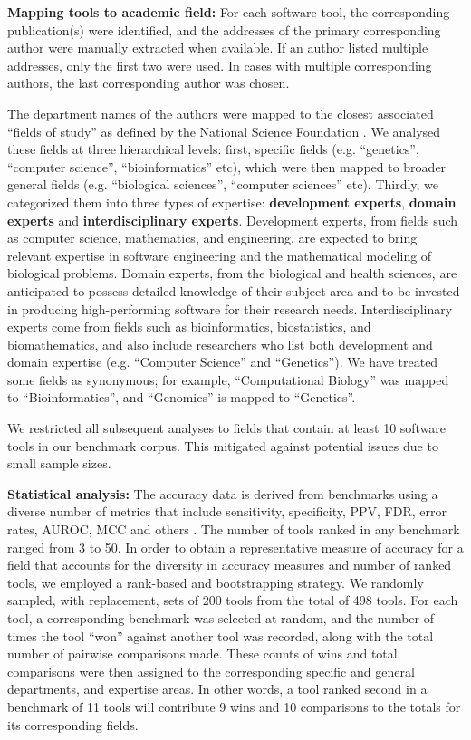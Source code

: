 \documentclass[fleqn,10pt,doc,onecolumn]{SelfArx}%
\begin{document}
\textbf{Mapping tools to academic field:} For each software tool, the
corresponding publication(s) were identified, and the addresses of the
primary corresponding author were manually extracted when
available. If an author listed multiple addresses, only the first two
were used. In cases with multiple corresponding authors, the last
corresponding author was chosen.


The department names of the authors were mapped to the closest
associated ``fields of study'' as defined by the National Science
Foundation \cite{fields2014}. We analysed these fields at three
hierarchical levels: first, specific fields (e.g. ``genetics'',
``computer science'', ``bioinformatics'' etc), which were then mapped
to broader general fields (e.g. ``biological sciences'', ``computer
sciences'' etc). Thirdly, we categorized them into three types of
expertise: \textbf{development experts}, \textbf{domain experts} and
\textbf{interdisciplinary experts}.  Development experts, from fields
such as computer science, mathematics, and engineering, are expected
to bring relevant expertise in software engineering and the
mathematical modeling of biological problems. Domain experts, from the
biological and health sciences, are anticipated to possess detailed
knowledge of their subject area and to be invested in producing
high-performing software for their research needs. Interdisciplinary
experts come from fields such as bioinformatics, biostatistics, and
biomathematics, and also include researchers who list both development
and domain expertise (e.g. ``Computer Science'' and ``Genetics''). We
have treated some fields as synonymous; for example, ``Computational
Biology'' was mapped to ``Bioinformatics'', and ``Genomics'' is mapped
to ``Genetics''.

We restricted all subsequent analyses to fields that contain at least 10
software tools in our benchmark corpus. This mitigated against
potential issues due to small sample sizes. 

\textbf{Statistical analysis:} The accuracy data is derived from
benchmarks using a diverse number of metrics that include sensitivity,
specificity, PPV, FDR, error rates, AUROC, MCC and others
\cite{weber2019essential}. The number of tools ranked in any benchmark
ranged from 3 to 50. In order to obtain a representative measure of
accuracy for a field that accounts for the diversity in accuracy
measures and number of ranked tools, we employed a rank-based and
bootstrapping strategy.  We randomly sampled, with replacement, sets
of 200 tools from the total of 498 tools. For each tool, a
corresponding benchmark was selected at random, and the number of
times the tool ``won'' against another tool was recorded, along with
the total number of pairwise comparisons made. These counts of wins
and total comparisons were then assigned to the corresponding
specific and general departments, and expertise areas.
In other words, a tool ranked second in a benchmark of 11 tools will
contribute 9 wins and 10 comparisons to the totals for its
corresponding fields.
\end{document}
